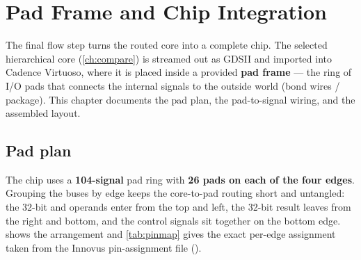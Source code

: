 \chapter{Pad Frame and Chip Integration}
\label{ch:pad}

The final flow step turns the routed core into a complete chip. The
selected hierarchical core (\cref{ch:compare}) is streamed out as GDSII and
imported into Cadence Virtuoso, where it is placed inside a provided
\textbf{pad frame} --- the ring of I/O pads that connects the internal
signals to the outside world (bond wires / package). This chapter
documents the pad plan, the pad-to-signal wiring, and the assembled
layout.

\section{Pad plan}
The chip uses a \textbf{104-signal} pad ring with \textbf{26 pads on each
of the four edges}. Grouping the buses by edge keeps the core-to-pad
routing short and untangled: the 32-bit  and  operands enter
from the top and left, the 32-bit  result leaves from the right and
bottom, and the control signals sit together on the bottom edge.
 shows the arrangement and \cref{tab:pinmap} gives the
exact per-edge assignment taken from the Innovus pin-assignment file
().

